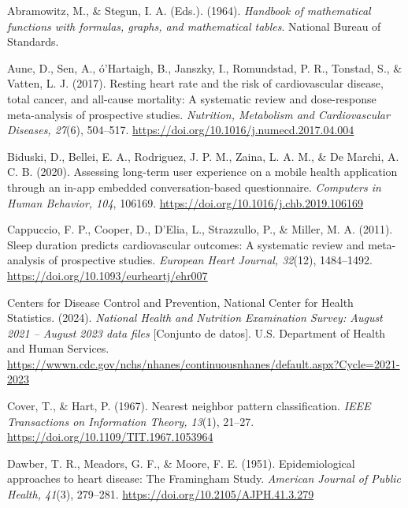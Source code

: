 \documentclass[12pt,letterpaper]{article}
\begin{document}
\begin{enumerate}[label={[\arabic*]}, leftmargin=2.2em]

\item Abramowitz, M., \& Stegun, I. A. (Eds.). (1964). \textit{Handbook of
mathematical functions with formulas, graphs, and mathematical tables}. National
Bureau of Standards.

\item Aune, D., Sen, A., ó'Hartaigh, B., Janszky, I., Romundstad, P. R.,
Tonstad, S., \& Vatten, L. J. (2017). Resting heart rate and the risk of
cardiovascular disease, total cancer, and all-cause mortality: A systematic
review and dose-response meta-analysis of prospective studies.
\textit{Nutrition, Metabolism and Cardiovascular Diseases, 27}(6), 504--517.
\url{https://doi.org/10.1016/j.numecd.2017.04.004}

\item Biduski, D., Bellei, E. A., Rodriguez, J. P. M., Zaina, L. A. M., \& De
Marchi, A. C. B. (2020). Assessing long-term user experience on a mobile health
application through an in-app embedded conversation-based questionnaire.
\textit{Computers in Human Behavior, 104}, 106169.
\url{https://doi.org/10.1016/j.chb.2019.106169}

\item Cappuccio, F. P., Cooper, D., D'Elia, L., Strazzullo, P., \& Miller, M. A.
(2011). Sleep duration predicts cardiovascular outcomes: A systematic review and
meta-analysis of prospective studies. \textit{European Heart Journal, 32}(12),
1484--1492. \url{https://doi.org/10.1093/eurheartj/ehr007}

\item Centers for Disease Control and Prevention, National Center for Health
Statistics. (2024). \textit{National Health and Nutrition Examination Survey:
August 2021 -- August 2023 data files} [Conjunto de datos]. U.S. Department of
Health and Human Services.
\url{https://wwwn.cdc.gov/nchs/nhanes/continuousnhanes/default.aspx?Cycle=2021-2023}

\item Cover, T., \& Hart, P. (1967). Nearest neighbor pattern classification.
\textit{IEEE Transactions on Information Theory, 13}(1), 21--27.
\url{https://doi.org/10.1109/TIT.1967.1053964}

\item Dawber, T. R., Meadors, G. F., \& Moore, F. E. (1951). Epidemiological
approaches to heart disease: The Framingham Study. \textit{American Journal of
Public Health, 41}(3), 279--281. \url{https://doi.org/10.2105/AJPH.41.3.279}


\end{enumerate}
\end{document}

